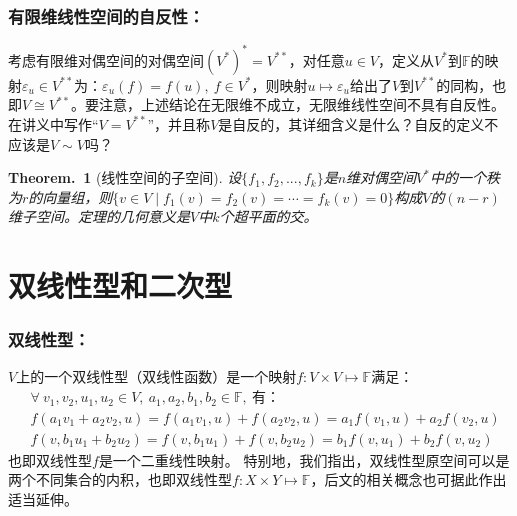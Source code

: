 \documentclass[zihao=5,UTF8]{report}
\theoremstyle{mystyle} %
\newtheorem{theorem}{Theorem.\,}
\begin{document}
\subsubsection{有限维线性空间的自反性：}
考虑有限维对偶空间的对偶空间$(V^*)^* = V^{**}$，对任意$u\in V$，定义从$V^*$到$\mathbb{F}$的映射$\varepsilon_u \in V^{**}$为：$\varepsilon_u(f) = f(u),\ f \in V^*$，则映射$u \longmapsto \varepsilon_u$给出了$V$到$V^{**}$的同构，也即$V \cong  V^{**}$。要注意，上述结论在无限维不成立，无限维线性空间不具有自反性。{\color{red}在讲义中写作“$V = V^{**}$”，并且称$V$是自反的，其详细含义是什么？自反的定义不应该是$V \sim V$吗？}

\begin{theorem}[线性空间的子空间]
    设$\{f_1,f_2,...,f_k\}$是$n$维对偶空间$V^*$中的一个秩为$r$的向量组，则$\{v \in V\mid f_1(v) = f_2(v) = \cdots = f_k(v) = 0\}$构成$V$的$(n - r)$维子空间。{\color{gray}\small 定理的几何意义是$V$中$k$个超平面的交。}
\end{theorem}
   
\section{双线性型和二次型}

\subsubsection{双线性型：}
$V$上的一个双线性型（双线性函数）是一个映射$f: V \times V \longmapsto \mathbb{F}$满足：
\begin{align*}
    &\forall\  v_1,v_2,u_1,u_2 \in V,\ a_1,a_2,b_1,b_2 \in \mathbb{F},\ \text{有：}\\
    &f(a_1v_1+a_2v_2,u) = f(a_1v_1,u) + f(a_2v_2,u) = a_1f(v_1,u) + a_2f(v_2,u)\\
    &f(v,b_1u_1 + b_2u_2) = f(v,b_1u_1) + f(v,b_2u_2) = b_1f(v,u_1) + b_2f(v,u_2)
\end{align*}
也即双线性型$f$是一个二重线性映射。
{\color{gray}\small 特别地，我们指出，双线性型原空间可以是两个不同集合的内积，也即双线性型$f:X\times Y \longmapsto \mathbb{F}$，后文的相关概念也可据此作出适当延伸。}
\end{document}
